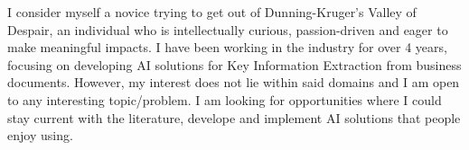 I consider myself a novice trying to get out of Dunning-Kruger's Valley of Despair, an individual who is intellectually curious, passion-driven and eager to make meaningful impacts. I have been working in the industry for over 4 years, focusing on developing AI solutions for Key Information Extraction from business documents. However, my interest does not lie within said domains and I am open to any interesting topic/problem. I am looking for opportunities where I could stay current with the literature, develope and implement AI solutions that people enjoy using.